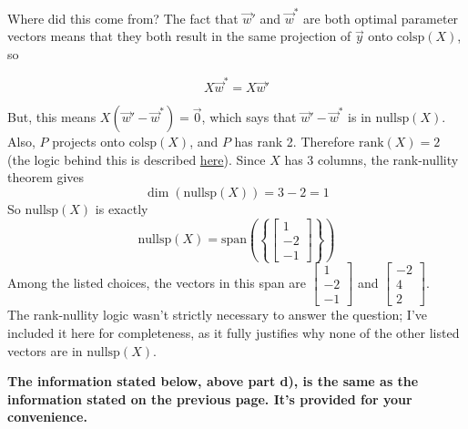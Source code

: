 \documentclass[11pt]{article}
\begin{document}
\begin{prob}[(19 pts)]
\begin{subprob}
\begin{solution}
Where did this come from? The fact that $\vec w'$ and $\vec w^*$ are both optimal parameter vectors means that they both result in the same projection of $\vec y$ onto $\text{colsp}(X)$, so

$$X \vec w^* = X \vec w'$$

But, this means $X(\vec w' - \vec w^*) = \vec 0$, which says that $\vec w' - \vec w^*$ is in $\text{nullsp}(X)$. \\

Also, $P$ projects onto $\text{colsp}(X)$, and $P$ has rank 2. Therefore $\text{rank}(X)=2$ (the logic behind this is described \href{https://notes.eecs245.org/linear-transformations-and-projections/complete-solution/\#example-is-p-invertible}{here}). Since $X$ has 3 columns, the rank-nullity theorem gives
\[
\dim(\text{nullsp}(X)) = 3 - 2 = 1
\]
So $\text{nullsp}(X)$ is exactly
\[
\text{nullsp}(X) =
\text{span}\left( \left\{ \begin{bmatrix} 1 \\ -2 \\ -1 \end{bmatrix} \right\} \right)
\]
Among the listed choices, the vectors in this span are $\begin{bmatrix} 1 \\ -2 \\ -1 \end{bmatrix}$ and $\begin{bmatrix} -2 \\ 4 \\ 2 \end{bmatrix}$. \\

The rank-nullity logic wasn't strictly necessary to answer the question; I've included it here for completeness, as it fully justifies why none of the other listed vectors are in $\text{nullsp}(X)$.

\end{solution}

\end{subprob}

\newpage

\textbf{The information stated below, above part \textbf{d)}, is the same as the information stated on the previous page. It's provided for your convenience.}


\end{prob}
\end{document}
